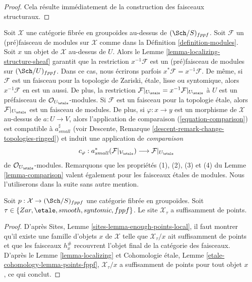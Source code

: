 \begin{proof}
Cela résulte immédiatement de la construction des faisceaux structuraux.
\end{proof}

\noindent
Soit $\mathcal{X}$ une catégorie fibrée en groupoïdes au-dessus de $(\Sch/S)_{fppf}$.
Soit $\mathcal{F}$ un (pré)faisceau de modules sur $\mathcal{X}$ comme dans la
Définition \ref{definition-modules}.
Soit $x$ un objet de $\mathcal{X}$ au-dessus de $U$. Alors le
Lemme \ref{lemma-localizing-structure-sheaf}
garantit que la restriction
$x^{-1}\mathcal{F}$ est un (pré)faisceau de modules sur $(\Sch/U)_{fppf}$.
Dans ce cas, nous écrirons parfois $x^*\mathcal{F} = x^{-1}\mathcal{F}$.
De même, si $\mathcal{F}$ est un faisceau pour la topologie de Zariski, \'etale, lisse
ou syntomique, alors $x^{-1}\mathcal{F}$ en est un aussi. De plus, la
restriction
$\mathcal{F}|_{U_\etale} = x^{-1}\mathcal{F}|_{U_\etale}$
à $U$ est un préfaisceau de $\mathcal{O}_{U_\etale}$-modules.
Si $\mathcal{F}$ est un faisceau pour la topologie \'etale, alors
$\mathcal{F}|_{U_\etale}$ est un faisceau de modules. De plus,
si $\varphi : x \to y$ est un morphisme de $\mathcal{X}$ au-dessus de
$a : U \to V$, alors l'application de comparaison (\ref{equation-comparison})
est compatible à $a_{small}^\sharp$ (voir
Descente, Remarque \ref{descent-remark-change-topologies-ringed})
et induit une application de {\it comparaison}
\begin{equation}
\label{equation-comparison-modules}
c_\varphi : a_{small}^*(\mathcal{F}|_{V_\etale})
\longrightarrow
\mathcal{F}|_{U_\etale}
\end{equation}
de $\mathcal{O}_{U_\etale}$-modules.
Remarquons que les propriétés (1), (2), (3) et (4) du
Lemme \ref{lemma-comparison}
valent également pour les faisceaux \'etales de modules.
Nous l'utiliserons dans la suite sans autre mention.

\begin{lemma}
\label{lemma-enough-points}
Soit $p : \mathcal{X} \to (\Sch/S)_{fppf}$ une catégorie fibrée
en groupoïdes. Soit $\tau \in \{Zar, \etale, smooth, syntomic, fppf\}$.
Le site $\mathcal{X}_\tau$ a suffisamment de points.
\end{lemma}

\begin{proof}
D'après
Sites, Lemme \ref{sites-lemma-enough-points-local},
il faut montrer qu'il existe une famille d'objets $x$ de $\mathcal{X}$
telle que $\mathcal{X}_\tau/x$ ait suffisamment de points et que les faisceaux
$h_x^\#$ recouvrent l'objet final de la catégorie des faisceaux.
D'après le
Lemme \ref{lemma-localizing}
et
Cohomologie \'etale, Lemme \ref{etale-cohomology-lemma-points-fppf},
$\mathcal{X}_\tau/x$ a suffisamment de points pour tout objet
$x$, ce qui conclut.
\end{proof}







